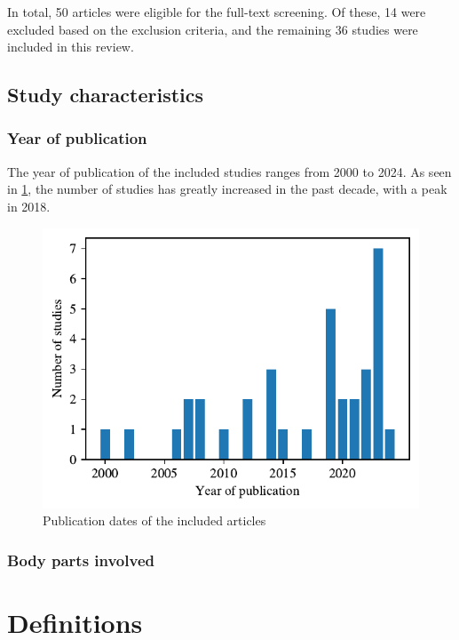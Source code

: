 In total, 50 articles were eligible for the full-text screening. Of these, 14 were excluded based on the exclusion criteria, and the remaining 36 studies were included in this review.


\subsection{Study characteristics}
\subsubsection{Year of publication}
The year of publication of the included studies ranges from 2000 to 2024. As seen in \ref{fig:years}, the number of studies has greatly increased in the past decade, with a peak in 2018.

\begin{figure}[htbp]
    \centering
    \includegraphics[width=\columnwidth]{figures/years.pdf} 
    \caption{Publication dates of the included articles}
    \label{fig:years}
\end{figure} 


\subsubsection{Body parts involved}

\section{Definitions}
